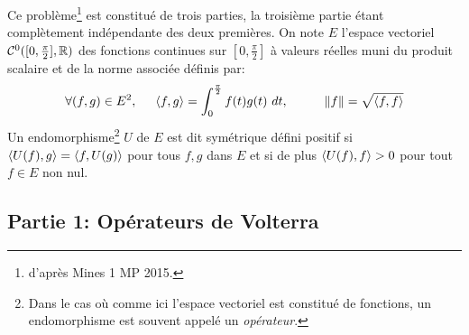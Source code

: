 Ce problème\footnote{d'après Mines 1 MP 2015.} est constitué de trois parties, la troisième partie étant complètement indépendante des deux premières.\newline
On note $E$ l'espace vectoriel $\mathcal{C}^{0}([0,\frac{\pi}{2}],\mathbb{R})$ des fonctions continues sur $[0,\frac{\pi}{2}]$ à valeurs réelles muni du produit scalaire et de la norme associée définis par:
\begin{displaymath}
\forall (f,g)\in E^2, \hspace{0.5cm} \left\langle {f} , {g} \right\rangle = \int_{0}^{\frac{\pi}{2}}f(t)g(t)\ dt, \hspace{1cm} \left\Vert f\right\Vert = \sqrt{\left\langle {f} , {f} \right\rangle}
\end{displaymath}
Un endomorphisme\footnote{Dans le cas où comme ici l'espace vectoriel est constitué de fonctions, un endomorphisme est souvent appelé un \emph{opérateur}.} $U$ de $E$ est dit symétrique défini positif si $\left\langle {U(f)} , {g} \right\rangle = \left\langle {f} , {U(g)} \right\rangle$ pour tous $f,g$ dans $E$ et si de plus $\left\langle {U(f)} , {f} \right\rangle>0$ pour tout $f\in E$ non nul.

\subsection*{Partie 1: Opérateurs de Volterra}

